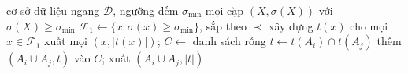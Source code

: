 \begin{algorithm}[!t]
\caption{Eclat: tìm kiếm theo chiều sâu trên các lớp tiền tố}
\label{alg:eclat}
\begin{algorithmic}[1]
\Require cơ sở dữ liệu ngang $\mathcal{D}$, ngưỡng đếm $\sigma_{\min}$
\Ensure mọi cặp $(X, \sigma(X))$ với $\sigma(X) \ge \sigma_{\min}$
\State $\mathcal{F}_1 \gets \{x : \sigma(x) \ge \sigma_{\min}\}$, sắp theo $\prec$ 
\State xây dựng $t(x)$ cho mọi $x \in \mathcal{F}_1$ 
\State xuất mọi $(x, |t(x)|)$; 
 
    \State $C \gets$ danh sách rỗng
      \State $t \gets t(A_i) \cap t(A_j)$ 
        \State thêm $(A_i \cup A_j, t)$ vào $C$; xuất $(A_i \cup A_j, |t|)$
      \EndIf
    \EndFor
      \State {} 
    \EndIf
  \EndFor
\EndProcedure
\end{algorithmic}
\end{algorithm}

